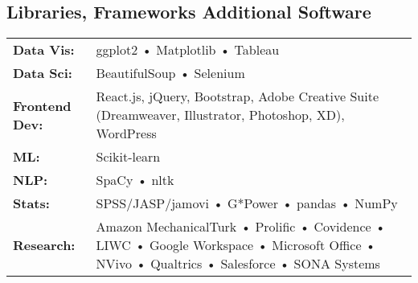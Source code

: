 \documentclass[10pt,a4paper]{cv-nl}
\begin{document}
\subsection{Libraries, Frameworks \bf{\Plus} Additional Software}
\vspace{2.5pt}
\begingroup
\renewcommand{\arraystretch}{1.5} 
\begin{tabular}{p{1.5in}<{\raggedleft\arraybackslash}p{4.435in}}
{\bf Data Vis:} & ggplot2 • Matplotlib • Tableau \\
{\bf Data Sci:} & BeautifulSoup • Selenium \\
{\bf Frontend Dev:} & React.js, jQuery, Bootstrap, Adobe Creative Suite (Dreamweaver, Illustrator, Photoshop, XD), WordPress \\
{\bf ML:} & Scikit-learn \\
{\bf NLP:} & SpaCy • nltk\\
{\bf Stats:} & SPSS/JASP/jamovi • G*Power • pandas • NumPy \\
{\bf Research:} & Amazon MechanicalTurk • Prolific • Covidence • LIWC • Google Workspace • Microsoft Office • NVivo • Qualtrics • Salesforce • SONA Systems 
\end{tabular}
\endgroup
\vspace{5pt}
\end{document}
